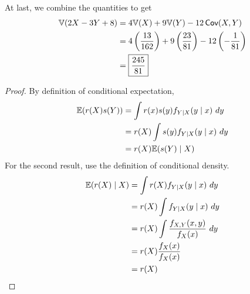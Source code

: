 \documentclass[a4paper]{article}
\begin{document}
At last, we combine the quantities to get
\begin{align*}
	\mathbb{V}(2X - 3Y + 8) & = 4 \mathbb{V}(X) + 9 \mathbb{V}(Y) - 12 \operatorname{\textsf{Cov}}(X,Y) \\
	 & = 4 \left( \frac{13}{162} \right) + 9 \left( \frac{23}{81} \right) - 12 \left( -\frac{1}{81} \right)  \\ 
	 & = \boxed{\frac{245}{81}}
\end{align*}

\begin{proof}[Proof] 
By definition of conditional expectation,
\begin{align*}
	\mathbb{E}(r(X)s(Y)) & = \int r(x) s(y) f_{Y \mid X}(y \mid x)  \ dy  \\
	 & = r(X) \int s(y) f_{Y \mid X}(y \mid x)  \ dy  \\ 
	 & = r(X) \mathbb{E}(s(Y) \mid X)
\end{align*}
For the second result, use the definition of conditional density.
\begin{align*}
	\mathbb{E}(r(X)  \mid  X) & = \int r(X) f_{Y \mid X}(y \mid x)  \ dy  \\
	 & = r(X) \int f_{Y \mid X}(y \mid x)  \ dy  \\ 
	 & = r(X) \int \frac{f_{X,Y}(x,y)}{f_{X}(x)} \ dy \\
	 & = r(X) \frac{f_{X}(x)}{f_{X}(x)} \\
	 & = r(X)
\end{align*}
\end{proof}
\end{document}
